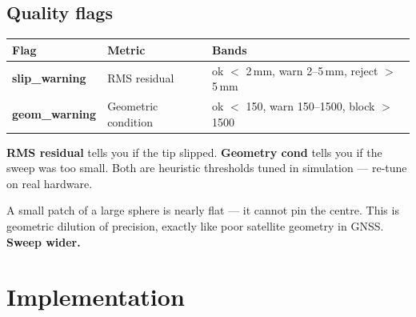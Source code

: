 \documentclass[11pt,a4paper]{article}
\begin{document}
\subsection{Quality flags}

\begin{center}
\begin{tabular}{@{}lll@{}}
\toprule
Flag & Metric & Bands \\
\midrule
\textbf{slip\_warning} & RMS residual &
  ok $<$ 2\,mm,\;\; warn 2--5\,mm,\;\; reject $>$ 5\,mm \\[3pt]
\textbf{geom\_warning} & Geometric condition &
  ok $<$ 150,\;\; warn 150--1500,\;\; block $>$ 1500 \\
\bottomrule
\end{tabular}
\end{center}

\textbf{RMS residual} tells you if the tip slipped.  \textbf{Geometry cond}
tells you if the sweep was too small.  Both are heuristic thresholds tuned in
simulation --- re-tune on real hardware.

\begin{center}
\end{center}

A small patch of a large sphere is nearly flat --- it cannot pin the centre.
This is geometric dilution of precision, exactly like poor satellite geometry in
GNSS.  \textbf{Sweep wider.}

\section{Implementation}
\end{document}
